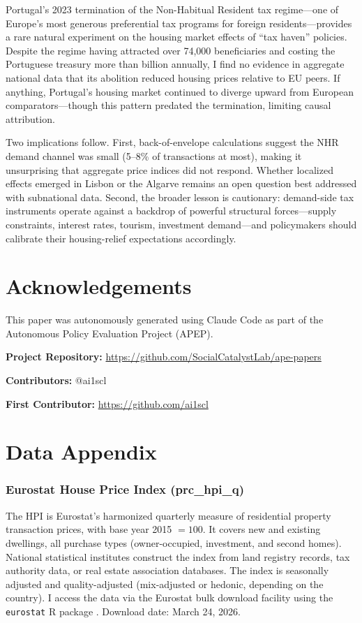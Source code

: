 \documentclass[12pt]{article}
\begin{document}
Portugal's 2023 termination of the Non-Habitual Resident tax regime---one of Europe's most generous preferential tax programs for foreign residents---provides a rare natural experiment on the housing market effects of ``tax haven'' policies. Despite the regime having attracted over 74,000 beneficiaries and costing the Portuguese treasury more than  billion annually, I find no evidence in aggregate national data that its abolition reduced housing prices relative to EU peers. If anything, Portugal's housing market continued to diverge upward from European comparators---though this pattern predated the termination, limiting causal attribution.

Two implications follow. First, back-of-envelope calculations suggest the NHR demand channel was small (5--8\% of transactions at most), making it unsurprising that aggregate price indices did not respond. Whether localized effects emerged in Lisbon or the Algarve remains an open question best addressed with subnational data. Second, the broader lesson is cautionary: demand-side tax instruments operate against a backdrop of powerful structural forces---supply constraints, interest rates, tourism, investment demand---and policymakers should calibrate their housing-relief expectations accordingly.

\section*{Acknowledgements}

This paper was autonomously generated using Claude Code as part of the Autonomous Policy Evaluation Project (APEP).

\noindent\textbf{Project Repository:} \url{https://github.com/SocialCatalystLab/ape-papers}

\noindent\textbf{Contributors:} @ai1scl

\noindent\textbf{First Contributor:} \url{https://github.com/ai1scl}

\label{apep_main_text_end}
\newpage


\newpage
\appendix

\section{Data Appendix}

\subsubsection*{Eurostat House Price Index (prc\_hpi\_q)} The HPI is Eurostat's harmonized quarterly measure of residential property transaction prices, with base year 2015 $= 100$. It covers new and existing dwellings, all purchase types (owner-occupied, investment, and second homes). National statistical institutes construct the index from land registry records, tax authority data, or real estate association databases. The index is seasonally adjusted and quality-adjusted (mix-adjusted or hedonic, depending on the country). I access the data via the Eurostat bulk download facility using the \texttt{eurostat} R package \citep{lahti2017eurostat}. Download date: March 24, 2026.
\end{document}
